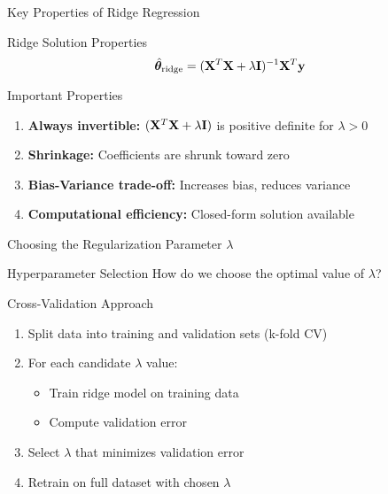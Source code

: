 \documentclass{beamer}
\begin{document}
\begin{frame}{Key Properties of Ridge Regression}
\begin{theorembox}{Ridge Solution Properties}
$$\hat{\boldsymbol{\theta}}_{\text{ridge}} = (\mathbf{X}^T\mathbf{X} + \lambda\mathbf{I})^{-1}\mathbf{X}^T\mathbf{y}$$
\end{theorembox}
\pause

\begin{keypointsbox}{Important Properties}
\begin{enumerate}
\item \textbf{Always invertible:} $(\mathbf{X}^T\mathbf{X} + \lambda\mathbf{I})$ is positive definite for $\lambda > 0$
\item \textbf{Shrinkage:} Coefficients are shrunk toward zero
\item \textbf{Bias-Variance trade-off:} Increases bias, reduces variance
\item \textbf{Computational efficiency:} Closed-form solution available
\end{enumerate}
\end{keypointsbox}
\end{frame}

\begin{frame}{Choosing the Regularization Parameter $\lambda$}
\begin{alertbox}{Hyperparameter Selection}
How do we choose the optimal value of $\lambda$?
\end{alertbox}
\pause

\begin{theorembox}{Cross-Validation Approach}
\begin{enumerate}
\item Split data into training and validation sets (k-fold CV)
\item For each candidate $\lambda$ value:
   \begin{itemize}
   \item Train ridge model on training data
   \item Compute validation error
   \end{itemize}
\item Select $\lambda$ that minimizes validation error
\item Retrain on full dataset with chosen $\lambda$
\end{enumerate}
\end{theorembox}
\end{frame}
\end{document}
